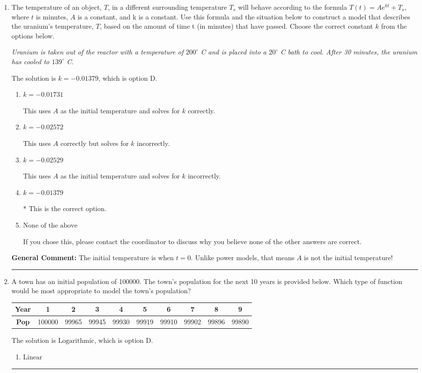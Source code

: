 \documentclass{extbook}[14pt]
\newcommand{\litem}[1]{\item #1

\rule{\textwidth}{0.4pt}}
\begin{document}
\begin{enumerate}\litem{
The temperature of an object, $T$, in a different surrounding temperature $T_s$ will behave according to the formula $T(t) = Ae^{kt} + T_s$, where $t$ is minutes, $A$ is a constant, and k is a constant. Use this formula and the situation below to construct a model that describes the uranium's temperature, $T$, based on the amount of time t (in minutes) that have passed. Choose the correct constant $k$ from the options below.

\begin{center}
    \textit{ Uranium is taken out of the reactor with a temperature of $200^{\circ}$ C and is placed into a $20^{\circ}$ C bath to cool. After 30 minutes, the uranium has cooled to $139^{\circ}$ C. }
\end{center}
The solution is \( k = -0.01379 \), which is option D.\begin{enumerate}[label=\Alph*.]
\item \( k = -0.01731 \)

This uses $A$ as the initial temperature and solves for $k$ correctly.
\item \( k = -0.02572 \)

This uses $A$ correctly but solves for $k$ incorrectly.
\item \( k = -0.02529 \)

This uses $A$ as the initial temperature and solves for $k$ incorrectly.
\item \( k = -0.01379 \)

* This is the correct option.
\item \( \text{None of the above} \)

If you chose this, please contact the coordinator to discuss why you believe none of the other answers are correct.
\end{enumerate}

\textbf{General Comment:} The initial temperature is when $t = 0$. Unlike power models, that means $A$ is not the initial temperature!
}
\litem{
A town has an initial population of 100000. The town's population for the next 10 years is provided below. Which type of function would be most appropriate to model the town's population?


\begin{tabular}{c|c|c|c|c|c|c|c|c|c}
\textbf{Year} &1 &2 &3 &4 &5 &6 &7 &8 &9\tabularnewline \hline
\textbf{Pop} &100000 &99965 &99945 &99930 &99919 &99910 &99902 &99896 &99890\end{tabular}The solution is \( \text{Logarithmic} \), which is option D.\begin{enumerate}[label=\Alph*.]
\item \( \text{Linear} \)


\end{enumerate}}
\end{enumerate}
\end{document}
